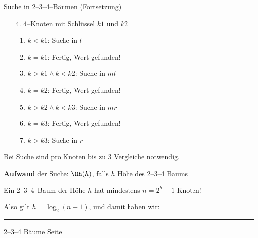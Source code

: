 \begin{slide}{}
\normalsize

\begin{center}
Suche in 2--3--4--B\"aumen (Fortsetzung)
\end{center}
\vspace*{0.5cm}

\footnotesize
\begin{enumerate}
\item[4.] 4--Knoten mit Schl\"ussel $k1$ und $k2$

      \hspace*{2cm} 

      \begin{enumerate}
      \item $k < k1$: Suche in $l$
      \item $k = k1$: Fertig, Wert gefunden!
      \item $k > k1 \wedge k < k2$: Suche in $ml$
      \item $k = k2$: Fertig, Wert gefunden!
      \item $k > k2 \wedge k < k3$: Suche in $mr$
      \item $k = k3$: Fertig, Wert gefunden!
      \item $k > k3$: Suche in $r$
      \end{enumerate}
\end{enumerate}

Bei Suche sind pro Knoten bis zu 3 Vergleiche notwendig.

\textbf{Aufwand} der Suche: $\Oh(h)$, falls $h$ H\"ohe des 2--3--4 Baums

Ein 2--3--4--Baum der H\"ohe $h$ hat mindestens $n = 2^h - 1$ Knoten!

Also gilt $h = \log_2(n+1)$, und damit haben wir:

\begin{center}
\end{center}

\vspace*{\fill}
\tiny \addtocounter{mypage}{1}
\rule{17cm}{1mm}
2--3--4 B\"aume  \hspace*{\fill} Seite 
\end{slide}


